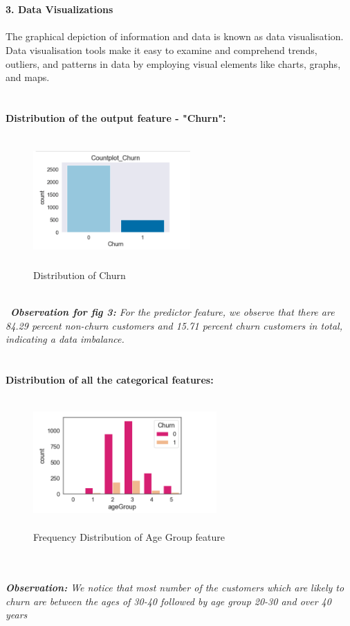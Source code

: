 \documentclass[a4paper, 10pt, conference]{ieeeconf}      %
\begin{document}
 
\\\
\\\textbf{3. Data Visualizations}
\\\
\\The graphical depiction of information and data is known as data visualisation. Data visualisation tools make it easy to examine and comprehend trends, outliers, and patterns in data by employing visual elements like charts, graphs, and maps.
\\\
\\\
\\\textbf{Distribution of the output feature - "Churn":}
\\
\begin{figure}[htp]
    \centering
    \includegraphics[width=6cm,height=5cm]{Images/churn_destribution_bar.png}
    \caption{Distribution of Churn}
\end{figure}
\\\
\textit{\textbf{Observation for fig 3:} For the predictor feature, we observe that there are 84.29 percent non-churn customers and 15.71 percent churn customers in total, indicating a data imbalance.}
\\\
\\
\\\textbf{Distribution of all the categorical features:}
\begin{figure}[htp]
    \centering
    \includegraphics[width=7cm,height=5cm]{Images/ageGroup.png}
    \caption{Frequency Distribution of Age Group feature}
    \label{fig:frequencyDistribution}
\end{figure}
\\\
\\\textit{\textbf{Observation:} We notice that most number of the customers which are likely to churn are between the ages of 30-40 followed by age group 20-30 and over 40 years}
\end{document}
